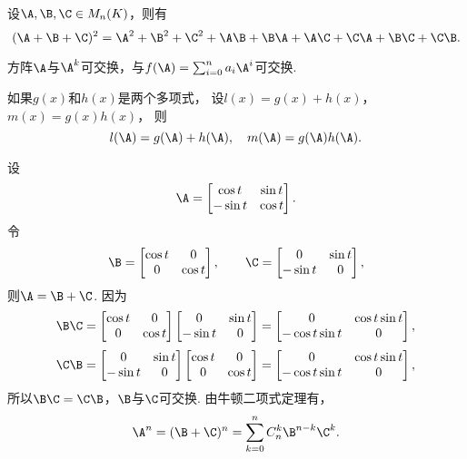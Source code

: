 \begin{example}
设\(\A,\B,\C \in M_n(K)\)，则有\[
	(\A + \B + \C)^2
	= \A^2 + \B^2 + \C^2 + \A\B + \B\A + \A\C + \C\A + \B\C + \C\B.
\]
\end{example}

\begin{theorem}
方阵\(\A\)与\(\A^k\)可交换，与\(f(\A) = \sum_{i=0}^n a_i \A^i\)可交换.
\end{theorem}

\begin{theorem}
如果\(g(x)\)和\(h(x)\)是两个多项式，
设\(l(x) = g(x) + h(x)\)，\(m(x) = g(x) h(x)\)，
则\[
	l(\A) = g(\A) + h(\A),
	\quad
	m(\A) = g(\A) h(\A).
\]
\end{theorem}

\begin{example}
设\[
	\A = \begin{bmatrix}
	\cos t & \sin t \\
	-\sin t & \cos t
	\end{bmatrix}.
\]
令\[
	\B = \begin{bmatrix}
		\cos t & 0 \\
		0 & \cos t
	\end{bmatrix},
	\qquad
	\C = \begin{bmatrix}
		0 & \sin t \\
		-\sin t & 0
	\end{bmatrix},
\]
则\(\A=\B+\C\).
因为\[
	\B\C = \begin{bmatrix}
		\cos t & 0 \\
		0 & \cos t
	\end{bmatrix}
	\begin{bmatrix}
		0 & \sin t \\
		-\sin t & 0
	\end{bmatrix}
	= \begin{bmatrix}
		0 & \cos t \sin t \\
		-\cos t \sin t & 0
	\end{bmatrix},
\]\[
	\C\B = \begin{bmatrix}
		0 & \sin t \\
		-\sin t & 0
	\end{bmatrix}
	\begin{bmatrix}
		\cos t & 0 \\
		0 & \cos t
	\end{bmatrix}
	= \begin{bmatrix}
		0 & \cos t \sin t \\
		-\cos t \sin t & 0
	\end{bmatrix},
\]
所以\(\B\C=\C\B\)，\(\B\)与\(\C\)可交换.
由牛顿二项式定理有，\[
	\A^n=(\B+\C)^n
	=\sum_{k=0}^n C_n^k \B^{n-k} \C^k.
\]
\end{example}

